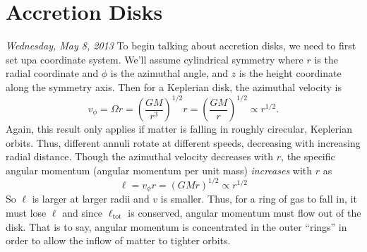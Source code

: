 \documentclass[10pt]{article}
\numberwithin{equation}{section}
\begin{document}
\section{Accretion Disks} %
\label{sec:accretion_disks}
\textit{Wednesday, May 8, 2013}
	To begin talking about accretion disks, we need to first set upa coordinate system. We'll assume cylindrical symmetry where $r$ is the radial coordinate and $\phi$ is the azimuthal angle, and $z$ is the height coordinate along the symmetry axis. Then for a Keplerian disk, the azimuthal velocity is
	\begin{equation}
		\label{eq:disk:1} v_\phi = \Omega r = \left(\frac{GM}{r^3}\right)^{1/2} r = \left(\frac{GM}{r}\right)^{1/2} \propto r^{1/2}.
	\end{equation}
	Again, this result only applies if matter is falling in roughly cirecular, Keplerian orbits. Thus, different annuli rotate at different speeds, decreasing with increasing radial distance. Though the azimuthal velocity decreases with $r$, the specific angular momentum (angular momentum per unit mass) \emph{increases} with $r$ as
	\begin{equation}
		\label{ea:disk:2} \ell = v_\phi r = \left(GMr\right)^{1/2}\propto r^{1/2}
	\end{equation}
	So $\ell$ is larger at larger radii and $v$ is smaller. Thus, for a ring of gas to fall in, it must lose $\ell$ and since $\ell_{\mathrm{tot}}$ is conserved, angular momentum must flow out of the disk. That is to say, angular momentum is concentrated in the outer ``rings'' in order to allow the inflow of matter to tighter orbits.\\
	
\end{document}
